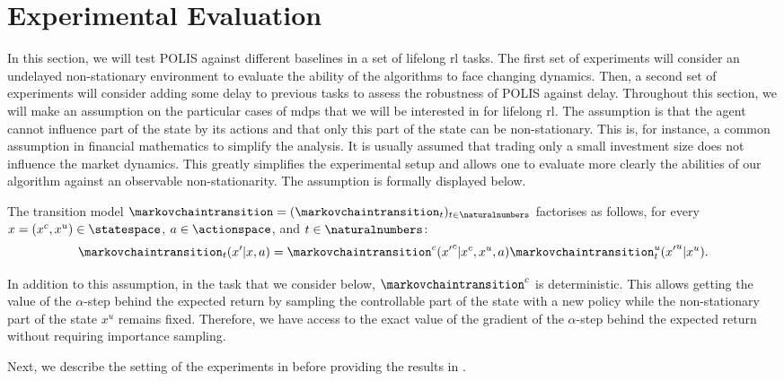 
\section{Experimental Evaluation}
\label{sec:experiments_lifelong}

In this section, we will test POLIS against different baselines in a set of lifelong \gls{rl} tasks.
The first set of experiments will consider an undelayed non-stationary environment to evaluate the ability of the algorithms to face changing dynamics. 
Then, a second set of experiments will consider adding some delay to previous tasks to assess the robustness of POLIS against delay.
Throughout this section, we will make an assumption on the particular cases of \glspl{mdp} that we will be interested in for lifelong \gls{rl}. 
The assumption is that the agent cannot influence part of the state by its actions and that only this part of the state can be non-stationary. 
This is, for instance, a common assumption in financial mathematics to simplify the analysis. 
It is usually assumed that trading only a small investment size does not influence the market dynamics.
This greatly simplifies the experimental setup and allows one to evaluate more clearly the abilities of our algorithm against an observable non-stationarity. 
The assumption is formally displayed below.
\begin{ass}
	\label{ass:factorable_state}
The transition model $\markovchaintransition= (\markovchaintransition_t)_{t \in \naturalnumbers}$ factorises as follows, for every $x = (x^c,x^u) \in \statespace$, $a \in \actionspace$, and $t \in \naturalnumbers$:
\begin{equation}
	\markovchaintransition_t(x'\vert x,a) = \markovchaintransition^c({x'}^c\vert x^c,x^u,a) \markovchaintransition_t^u({x'}^u\vert x^u) .
\end{equation}
\end{ass}

In addition to this assumption, in the task that we consider below, $\markovchaintransition^c$ is deterministic. 
This allows getting the value of the $\alpha$-step behind the expected return by sampling the controllable part of the state with a new policy while the non-stationary part of the state $x^u$ remains fixed. 
Therefore, we have access to the exact value of the gradient of the $\alpha$-step behind the expected return without requiring importance sampling. 

Next, we describe the setting of the experiments in  before providing the results in . 


